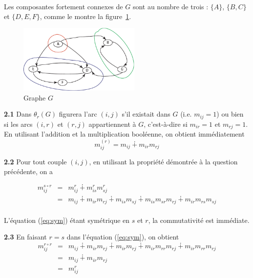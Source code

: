 \documentclass{article}
\begin{document}
Les composantes fortement connexes de $G$ sont au nombre de trois :
$\{A\}$, $\{B,C\}$ et $\{D,E,F\}$, comme le montre la
figure~\ref{fig:cc}.

\begin{figure}[htbp]
  \begin{center}
    \includegraphics[width=6cm]{td_rw_cc.pdf}
    \caption{Graphe $G$}
    \label{fig:cc}
  \end{center}
\end{figure}

\textbf{2.1} Dans $\theta_r(G)$ figurera l'arc $(i,j)$ s'il existait
dans $G$ (i.e. $m_{ij} = 1$) ou bien si les arcs $(i,r)$ et $(r,j)$
appartiennent à $G$, c'est-à-dire si $m_{ir} = 1$ et $m_{rj} = 1$. En
utilisant l'addition et la multiplication booléenne, on obtient
immédiatement
\begin{equation}
  m_{ij}^{(r)} = m_{ij} \dotplus m_{ir}m_{rj}
\end{equation}

\textbf{2.2} Pour tout couple $(i,j)$, en utilisant la propriété
démontrée à la question précédente, on a

\begin{equation}
  \begin{array}{rcl}
  m_{ij}^{s\circ r} & = & m_{ij}^r \dotplus m_{is}^r m_{sj}^r \\
  & = & m_{ij} \dotplus m_{ir} m_{rj} \dotplus m_{is} m_{sj} \dotplus
  m_{is} m_{sr} m_{rj} \dotplus m_{ir} m_{rs} m_{sj} \\
  \label{eq:sym}
\end{array}
\end{equation}

L'équation (\ref{eq:sym}) étant symétrique en $s$ et $r$, la
commutativité est immédiate.

\textbf{2.3} En faisant $r=s$ dans l'équation (\ref{eq:sym}), on obtient
\begin{equation}
  \begin{array}{rcl}
  m_{ij}^{r\circ r} & = & 
  m_{ij} \dotplus m_{ir} m_{rj} \dotplus m_{ir} m_{rj} \dotplus
  m_{ir} m_{rr} m_{rj} \dotplus m_{ir} m_{rr} m_{rj} \\
  & = & m_{ij} \dotplus m_{ir}m_{rj} \\
  & = & m_{ij}^r \\
\end{array}
\end{equation}
\end{document}
